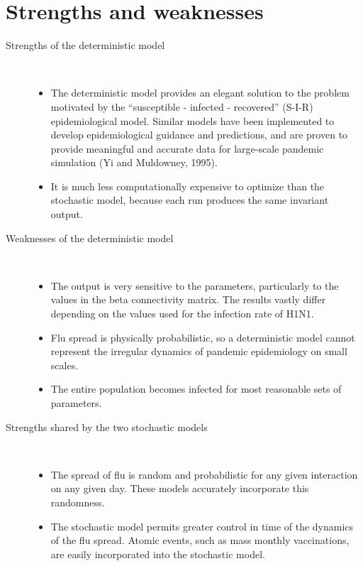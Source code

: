 \documentclass[titlepage]{article}
\begin{document}
\section{Strengths and weaknesses}
\begin{description}
\item[Strengths of the deterministic model]\hfill\\
\begin{itemize}
\item The deterministic model provides an elegant solution to the problem motivated by the ``susceptible - infected - recovered'' (S-I-R) epidemiological model. Similar models have been implemented to develop epidemiological guidance and predictions, and are proven to provide meaningful and accurate data for large-scale pandemic simulation (Yi and Muldowney, 1995).

\item It is much less computationally expensive to optimize than the stochastic model, because each run produces the same invariant output.
\end{itemize}
 

\item[Weaknesses of the deterministic model]\hfill \\
\begin{itemize}
\item The output is very sensitive to the parameters, particularly to the values in the beta connectivity matrix. The results vastly differ depending on the values used for the infection rate of H1N1.

\item Flu spread is physically probabilistic, so a deterministic model cannot represent the irregular dynamics of pandemic epidemiology on small scales.

\item The entire population becomes infected for most reasonable sets of parameters.
\end{itemize}

 

\item[Strengths shared by the two stochastic models]\hfill \\
\begin{itemize}
\item The spread of flu is random and probabilistic for any given interaction on any given day. These models accurately incorporate this randomness.

\item The stochastic model permits greater control in time of the dynamics of the flu spread. Atomic events, such as mass monthly vaccinations, are easily incorporated into the stochastic model.


\end{itemize}
\end{description}
\end{document}
